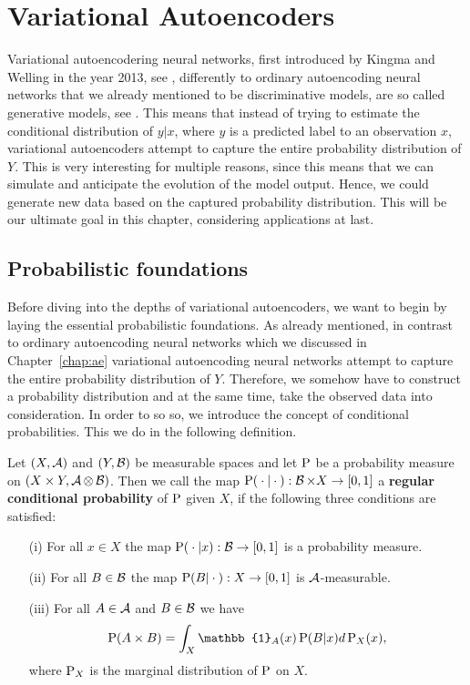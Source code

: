 \chapter{Variational Autoencoders}\label{chap:vae}
Variational autoencodering neural networks, first introduced by Kingma and Welling in the year 2013, see \cite{kingma2013auto}, differently to ordinary autoencoding neural networks that we already mentioned to be discriminative models, are so called generative models, see \cite[Chapter~5]{cinelli2021variational}. This means that instead of trying to estimate the conditional distribution of $y|x$, where $y$ is a predicted label to an observation $x$, variational autoencoders attempt to capture the entire probability distribution of $Y$. This is very interesting for multiple reasons, since this means that we can simulate and anticipate the evolution of the model output. Hence, we could generate new data based on the captured probability distribution. This will be our ultimate goal in this chapter, considering applications at last.

\section{Probabilistic foundations}\label{sec:prob_foundations}

Before diving into the depths of variational autoencoders, we want to begin by laying the essential probabilistic foundations. As already mentioned, in contrast to ordinary autoencoding neural networks which we discussed in Chapter~\ref{chap:ae} variational autoencoding neural networks attempt to capture the entire probability distribution of $Y$. Therefore, we somehow have to construct a probability distribution and at the same time, take the observed data into consideration. In order to so so, we introduce the concept of conditional probabilities. This we do in the following definition.

\begin{definition}\label{def:cond_prob}
Let $(X,\operatorname{\mathcal{A}})$ and $(Y,\operatorname{\mathcal{B}})$ be measurable spaces and let $\operatorname{\text{P}}$ be a probability measure on $(X\times Y, \operatorname{\mathcal{A}}\otimes \operatorname{\mathcal{B}})$. Then we call the map $\operatorname{\text{P}}({}\cdot{}|{}\cdot{}):\operatorname{\mathcal{B}}\times X \to [0, 1]$ a \textbf{regular conditional probability} of $\operatorname{\text{P}}$ given $X$, if the following three conditions are satisfied:
\begin{itemize}
\item[(i)]   For all $x\in X$ the map $\operatorname{\text{P}}({}\cdot{}|x): \operatorname{\mathcal{B}} \to [0,1]$ is a probability measure.
\item[(ii)]  For all $B\in\operatorname{\mathcal{B}}$ the map $\operatorname{\text{P}}(B|{}\cdot{}): X \to [0,1]$ is $\operatorname{\mathcal{A}}$-measurable.
\item[(iii)] For all $A\in\operatorname{\mathcal{A}}$ and $B\in\operatorname{\mathcal{B}}$ we have \begin{align*}
\prob(A\times B) = \int_{X} \mathbb{1}_{A}(x) \prob(B|x)d\prob_X(x),
\end{align*}
where $\operatorname{\text{P}}_X$ is the marginal distribution of $\operatorname{\text{P}}$ on $X$.
\end{itemize}
\end{definition}

